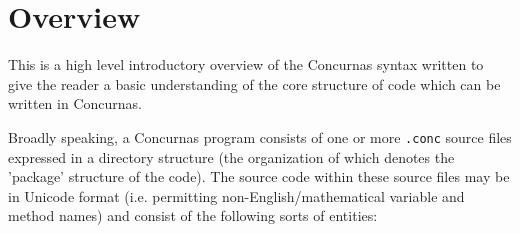 \documentclass[conc-doc]{subfiles}
\begin{document}
	
\chapter{Overview}


This is a high level introductory overview of the Concurnas syntax written to give the reader a basic understanding of the core structure of code which can be written in Concurnas.

Broadly speaking, a Concurnas program consists of one or more \lstinline{.conc} source files expressed in a directory structure (the organization of which denotes the 'package' structure of the code). The source code within these source files may be in Unicode format (i.e. permitting non-English/mathematical variable and method names) and consist of the following sorts of entities:
\end{document}
